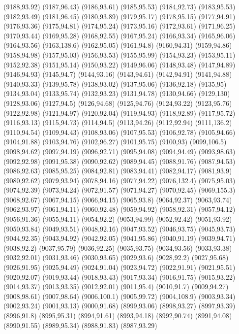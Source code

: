 (9188,93.92)
(9187,96.43)
(9186,93.61)
(9185,95.53)
(9184,92.73)
(9183,95.53)
(9182,93.49)
(9181,96.45)
(9180,93.89)
(9179,95.17)
(9178,95.15)
(9177,94.91)
(9176,93.36)
(9175,94.81)
(9174,95.24)
(9173,95.16)
(9172,93.61)
(9171,96.25)
(9170,93.44)
(9169,95.28)
(9168,92.55)
(9167,95.24)
(9166,93.34)
(9165,96.06)
(9164,93.56)
(9163,138.6)
(9162,95.05)
(9161,94.8)
(9160,94.31)
(9159,94.86)
(9158,94.98)
(9157,95.03)
(9156,93.53)
(9155,95.99)
(9154,93.23)
(9153,95.11)
(9152,92.38)
(9151,95.14)
(9150,93.22)
(9149,96.06)
(9148,93.48)
(9147,94.89)
(9146,94.93)
(9145,94.7)
(9144,93.16)
(9143,94.61)
(9142,94.91)
(9141,94.88)
(9140,93.33)
(9139,95.78)
(9138,93.02)
(9137,95.06)
(9136,92.18)
(9135,95)
(9134,93.04)
(9133,95.74)
(9132,93.23)
(9131,94.78)
(9130,94.66)
(9129,130)
(9128,93.06)
(9127,94.5)
(9126,94.68)
(9125,94.76)
(9124,93.22)
(9123,95.76)
(9122,92.98)
(9121,94.97)
(9120,92.04)
(9119,94.93)
(9118,92.89)
(9117,95.72)
(9116,93.13)
(9115,94.73)
(9114,94.5)
(9113,94.26)
(9112,92.94)
(9111,136.2)
(9110,94.54)
(9109,94.43)
(9108,93.06)
(9107,95.53)
(9106,92.78)
(9105,94.66)
(9104,91.88)
(9103,94.76)
(9102,96.27)
(9101,95.75)
(9100,93)
(9099,106.5)
(9098,94.62)
(9097,94.19)
(9096,92.71)
(9095,94.08)
(9094,94.49)
(9093,98.63)
(9092,92.98)
(9091,95.38)
(9090,92.62)
(9089,94.45)
(9088,91.76)
(9087,94.53)
(9086,92.63)
(9085,95.25)
(9084,92.81)
(9083,94.41)
(9082,94.17)
(9081,93.9)
(9080,92.62)
(9079,93.94)
(9078,94.16)
(9077,94.22)
(9076,132.4)
(9075,95.03)
(9074,92.39)
(9073,94.24)
(9072,91.57)
(9071,94.27)
(9070,92.45)
(9069,155.3)
(9068,92.67)
(9067,94.15)
(9066,94.15)
(9065,93.8)
(9064,92.37)
(9063,93.74)
(9062,93.97)
(9061,94.11)
(9060,92.48)
(9059,94.92)
(9058,92.31)
(9057,94.12)
(9056,91.36)
(9055,94.11)
(9054,92.2)
(9053,94.99)
(9052,92.42)
(9051,93.92)
(9050,93.84)
(9049,93.51)
(9048,92.16)
(9047,93.52)
(9046,93.75)
(9045,93.73)
(9044,92.35)
(9043,94.92)
(9042,92.05)
(9041,95.86)
(9040,91.19)
(9039,94.71)
(9038,92.2)
(9037,95.79)
(9036,92.25)
(9035,93.75)
(9034,93.56)
(9033,93.38)
(9032,92.01)
(9031,93.46)
(9030,93.65)
(9029,93.6)
(9028,92.2)
(9027,95.68)
(9026,91.95)
(9025,94.49)
(9024,91.04)
(9023,94.72)
(9022,91.91)
(9021,95.51)
(9020,92.07)
(9019,93.44)
(9018,93.43)
(9017,93.34)
(9016,91.75)
(9015,93.22)
(9014,93.37)
(9013,93.35)
(9012,92.01)
(9011,95.4)
(9010,91.7)
(9009,94.27)
(9008,98.61)
(9007,98.64)
(9006,100.1)
(9005,99.72)
(9004,108.9)
(9003,93.34)
(9002,93.24)
(9001,93.13)
(9000,91.68)
(8999,93.06)
(8998,93.27)
(8997,93.39)
(8996,91.8)
(8995,95.31)
(8994,91.61)
(8993,94.18)
(8992,90.74)
(8991,94.08)
(8990,91.55)
(8989,95.34)
(8988,91.83)
(8987,93.29)
